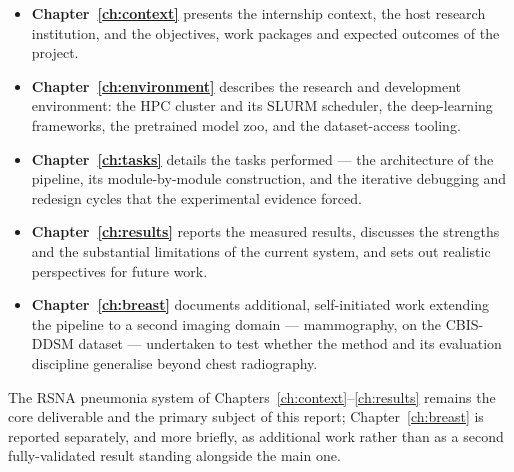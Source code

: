 \begin{itemize}[leftmargin=*]
  \item \textbf{Chapter~\ref{ch:context}} presents the internship
        context, the host research institution, and the objectives, work
        packages and expected outcomes of the project.
  \item \textbf{Chapter~\ref{ch:environment}} describes the research and
        development environment: the HPC cluster and its SLURM scheduler,
        the deep-learning frameworks, the pretrained model zoo, and the
        dataset-access tooling.
  \item \textbf{Chapter~\ref{ch:tasks}} details the tasks performed ---
        the architecture of the pipeline, its module-by-module
        construction, and the iterative debugging and redesign cycles
        that the experimental evidence forced.
  \item \textbf{Chapter~\ref{ch:results}} reports the measured results,
        discusses the strengths and the substantial limitations of the
        current system, and sets out realistic perspectives for future
        work.
  \item \textbf{Chapter~\ref{ch:breast}} documents additional,
        self-initiated work extending the pipeline to a second imaging
        domain --- mammography, on the CBIS-DDSM dataset --- undertaken to
        test whether the method and its evaluation discipline generalise
        beyond chest radiography.
\end{itemize}

The RSNA pneumonia system of Chapters~\ref{ch:context}--\ref{ch:results}
remains the core deliverable and the primary subject of this report;
Chapter~\ref{ch:breast} is reported separately, and more briefly, as
additional work rather than as a second fully-validated result standing
alongside the main one.

\clearpage
